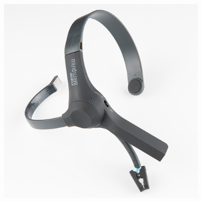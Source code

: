 \documentclass[a4 paper,12pt]{article}
\begin{document}
\begin{center}
	\graphicspath{ {images/} }
	\includegraphics[width=12cm, height=10cm]{Mindwave_mobile}
\end{center}

	
\end{document}
